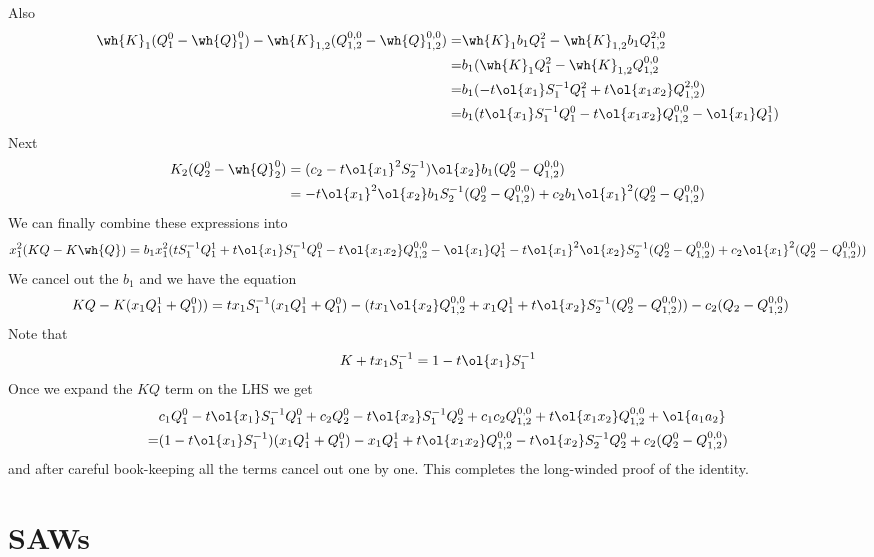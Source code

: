 Also
\begin{align}
 \wh{K}_1(Q_1^0-\wh{Q}_1^0) -\wh{K}_{1,2}(Q_{1,2}^{0,0}-\wh{Q}_{1,2}^{0,0})=&\wh{K}_1b_1Q_1^2-\wh{K}_{1,2}b_1Q_{1,2}^{2,0}\\
=&b_1(\wh{K}_1Q_1^2-\wh{K}_{1,2}Q_{1,2}^{0,0}\\
=&b_1(-t\ol{x_1}S_1^{-1}Q_1^2+t\ol{x_1x_2}Q_{1,2}^{2,0}) \\
=&b_1(t\ol{x_1}S_1^{-1}Q_1^0-t\ol{x_1x_2}Q_{1,2}^{0,0}-\ol{x_1}Q_1^1)
\end{align}
Next
\begin{align}
K_2(Q_2^0-\wh{Q}_2^0) &=(c_2 -t\ol{x_1}^2S_2^{-1})\ol{x_2}b_1(Q_2^0-Q_{1,2}^{0,0})\\ 
                                                     &=-t\ol{x_1}^2\ol{x_2}b_1S_2^{-1}(Q_2^0-Q_{1,2}^{0,0})+c_2b_1\ol{x_1}^2(Q_2^0-Q_{1,2}^{0,0})
\end{align}
We can finally combine these expressions into
\begin{align}
x_1^2(KQ-K\wh{Q}) = b_1x_1^2(tS_1^{-1}Q_1^1+t\ol{x_1}S_1^{-1}Q_1^0-t\ol{x_1x_2}Q_{1,2}^{0,0}-\ol{x_1}Q_1^1-t\ol{x_1}^2\ol{x_2}S_2^{-1}(Q_2^0-Q_{1,2}^{0,0})+c_2\ol{x_1}^2(Q_2^0-Q_{1,2}^{0,0}))
\end{align}
We cancel out the $b_1$ and we have the equation
\begin{align}
KQ-K(x_1Q_1^1+Q_1^0)) &= tx_1S_1^{-1}(x_1Q_1^1+Q_1^0) - (tx_1\ol{x_2}Q_{1,2}^{0,0}+x_1Q_1^1+t\ol{x_2}S_2^{-1}(Q_2^0-Q_{1,2}^{0,0}))-c_2(Q_2-Q_{1,2}^{0,0})
\end{align}
Note that
\begin{align}
  K+tx_1S_1^{-1} = 1- t\ol{x_1}S_1^{-1}
\end{align}
Once we expand the $KQ$ term on the LHS we get
\begin{align}
&c_1Q_1^0-t\ol{x_1}S_1^{-1}Q_1^0+c_2Q_2^0-t\ol{x_2}S_1^{-1}Q_2^0+c_1c_2Q_{1,2}^{0,0}+t\ol{x_1x_2}Q_{1,2}^{0,0}+\ol{a_1a_2}\\
=&(1-t\ol{x_1}S_1^{-1})(x_1Q_1^1+Q_1^0)-x_1Q_1^1+t\ol{x_1x_2}Q_{1,2}^{0,0}-t\ol{x_2}S_2^{-1}Q_2^0+c_2(Q_2^0-Q_{1,2}^{0,0})
\end{align}
and after careful book-keeping all the terms cancel out one by one. This completes the long-winded proof of the identity.
\section{SAWs}

